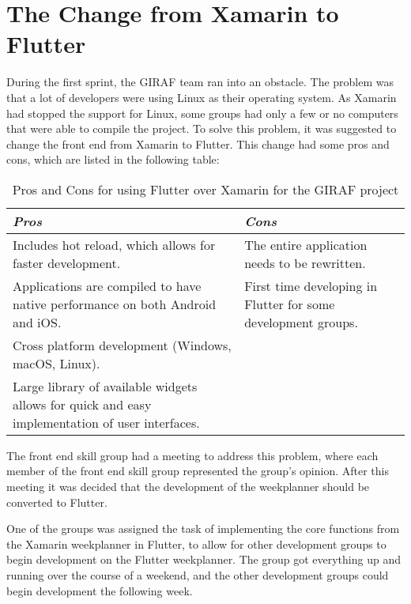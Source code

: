 \section{The Change from Xamarin to Flutter}
\label{sect:XamarinToFlutter}

During the first sprint, the GIRAF team ran into an obstacle. The problem was that a lot of developers were using Linux as their operating system. As Xamarin had stopped the support for Linux, some groups had only a few or no computers that were able to compile the project.
To solve this problem, it was suggested to change the front end from Xamarin to Flutter. This change had some pros and cons, which are listed in the following table:

\begin{table}[H]
\begin{tabularx}{\textwidth-7pt}{X|X}
\textit{Pros}    & \textit{Cons}  \\ \hline
Includes hot reload, which allows for faster development. & The entire application needs to be rewritten. \\ \hline
Applications are compiled to have native performance on both Android and iOS. &  First time developing in Flutter for some development groups. \\ \hline
Cross platform development (Windows, macOS, Linux). & \cellcolor{Gray}\\ \hline
Large library of available widgets allows for quick and easy implementation of user interfaces. & \cellcolor{Gray}\\
\end{tabularx}
\caption{Pros and Cons for using Flutter over Xamarin for the GIRAF project \citep{cite:flutter}}
\label{table:changeFromXamarinToFlutterProsCons}
\end{table}

The front end skill group had a meeting to address this problem, where each member of the front end skill group represented the group's opinion. After this meeting it was decided that the development of the weekplanner should be converted to Flutter.

One of the groups was assigned the task of implementing the core functions from the Xamarin weekplanner in Flutter, to allow for other development groups to begin development on the Flutter weekplanner. The group got everything up and running over the course of a weekend, and the other development groups could begin development the following week.

